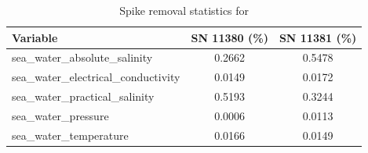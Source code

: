 \begin{table}[h]
\centering
\caption{Spike removal statistics for \projectname{} \casenumber{}}
\label{tab:ntas17_spike_stats}
\begin{tabular}{|l|c|c|}
\hline
Variable & SN 11380 (\%) & SN 11381 (\%) \\
\hline
sea\_water\_absolute\_salinity & 0.2662 & 0.5478 \\
sea\_water\_electrical\_conductivity & 0.0149 & 0.0172 \\
sea\_water\_practical\_salinity & 0.5193 & 0.3244 \\
sea\_water\_pressure & 0.0006 & 0.0113 \\
sea\_water\_temperature & 0.0166 & 0.0149 \\
\hline
\end{tabular}
\end{table}
